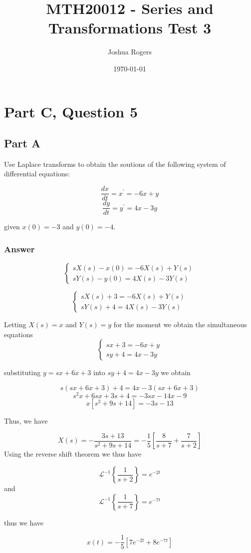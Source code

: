 \documentclass{article}
\title{\vspace{-4cm}MTH20012 - Series and Transformations Test 3}
\author{Joshua Rogers}
\date\today
\begin{document}
\maketitle 

\section*{Part C, Question 5}
\subsection*{Part A}
Use Laplace transforms to obtain the soutions of the following system of differential equations:

$$
\frac{dx}{dt} = x^{'} = -6x+y
$$
$$
\frac{dy}{dt} = y^{'} = 4x-3y
$$

given $x(0) = -3$ and $y(0) =-4$.
\subsubsection*{Answer}

\[ \begin{cases}
sX(s)-x(0)=-6X(s)+Y(s) \\
sY(s)-y(0) = 4X(s)-3Y(s)
   \end{cases}
\]

\[ \begin{cases}
sX(s)+3=-6X(s)+Y(s) \\
sY(s)+4 = 4X(s)-3Y(s)
   \end{cases}
\]

Letting $X(s)=x$ and $Y(s)=y$ for the moment we obtain the simultaneous equations
\[ \begin{cases}
sx+3=-6x+y \\
sy+4 = 4x-3y
   \end{cases}
\]

substituting $y=sx+6x+3$ into $sy+4=4x-3y$ we obtain

$$s(sx+6x+3)+4=4x-3(sx+6x+3)$$
$$s^2x+6sx+3s+4=-3sx-14x-9$$
$$x\left[s^2+9s+14\right]=-3s-13$$

Thus, we have

$$X(s) = -\frac{3s+13}{s^2+9s+14} = -\frac{1}{5} \left[ \frac{8}{s+7}+\frac{7}{s+2}\right]$$
Using the reverse shift theorem we thus have

$$\mathcal{L}^{-1}\left\{\frac{1}{s+2}\right\} = e^{-2t}$$
and
$$\mathcal{L}^{-1}\left\{\frac{1}{s+7}\right\} = e^{-7t}$$

thus we have

$$x(t) = -\frac{1}{5} \left[ 7e^{-2t}+8e^{-7t}\right]$$
\end{document}
